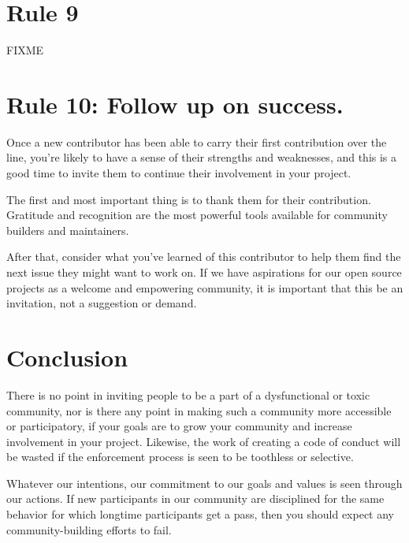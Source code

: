 \documentclass[10pt,letterpaper]{article}
\newcommand{\rulemajor}[1]{\section*{#1}}
\begin{document}
\rulemajor{Rule 9}

FIXME

\rulemajor{Rule 10: Follow up on success.}

Once a new contributor has been able to carry their first contribution over the line, 
you're likely to have a sense of their strengths and weaknesses,
and this is a good time to invite them to continue their involvement in your project.

The first and most important thing is to thank them for their contribution.
Gratitude and recognition are the most powerful tools available for community builders and maintainers. 

After that,
consider what you've learned of this contributor to help them find
the next issue they might want to work on.
If we have aspirations for our open source projects as a welcome and empowering community,
it is important that this be an invitation,
not a suggestion or demand. 

\section*{Conclusion}

There is no point in inviting people to be a part of a dysfunctional or toxic community,
nor is there any point in making such a community more accessible or participatory,
if your goals are to grow your community and increase involvement in your project.
Likewise,
the work of creating a code of conduct will be wasted
if the enforcement process is seen to be toothless or selective.

Whatever our intentions,
our commitment to our goals and values is seen through our actions.
If new participants in our community are disciplined for the same behavior
for which longtime participants get a pass,
then you should expect any community-building efforts to fail.


\end{document}
